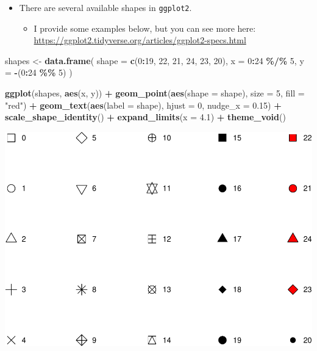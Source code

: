 \documentclass[
]{book}
\newenvironment{Shaded}{\begin{snugshade}}{\end{snugshade}}
\newcommand{\AttributeTok}[1]{\textcolor[rgb]{0.13,0.29,0.53}{#1}}
\newcommand{\DecValTok}[1]{\textcolor[rgb]{0.00,0.00,0.81}{#1}}
\newcommand{\FloatTok}[1]{\textcolor[rgb]{0.00,0.00,0.81}{#1}}
\newcommand{\FunctionTok}[1]{\textcolor[rgb]{0.13,0.29,0.53}{\textbf{#1}}}
\newcommand{\NormalTok}[1]{#1}
\newcommand{\OtherTok}[1]{\textcolor[rgb]{0.56,0.35,0.01}{#1}}
\newcommand{\SpecialCharTok}[1]{\textcolor[rgb]{0.81,0.36,0.00}{\textbf{#1}}}
\newcommand{\StringTok}[1]{\textcolor[rgb]{0.31,0.60,0.02}{#1}}
\providecommand{\tightlist}{%
  \setlength{\itemsep}{0pt}\setlength{\parskip}{0pt}}
\begin{document}
\begin{itemize}
\tightlist
\item
  There are several available shapes in \texttt{ggplot2}.

  \begin{itemize}
  \tightlist
  \item
    I provide some examples below, but you can see more here: \url{https://ggplot2.tidyverse.org/articles/ggplot2-specs.html}
  \end{itemize}
\end{itemize}

\begin{Shaded}
\begin{Highlighting}[]
\NormalTok{shapes }\OtherTok{\textless{}{-}} \FunctionTok{data.frame}\NormalTok{(}
  \AttributeTok{shape =} \FunctionTok{c}\NormalTok{(}\DecValTok{0}\SpecialCharTok{:}\DecValTok{19}\NormalTok{, }\DecValTok{22}\NormalTok{, }\DecValTok{21}\NormalTok{, }\DecValTok{24}\NormalTok{, }\DecValTok{23}\NormalTok{, }\DecValTok{20}\NormalTok{),}
  \AttributeTok{x =} \DecValTok{0}\SpecialCharTok{:}\DecValTok{24} \SpecialCharTok{\%/\%} \DecValTok{5}\NormalTok{,}
  \AttributeTok{y =} \SpecialCharTok{{-}}\NormalTok{(}\DecValTok{0}\SpecialCharTok{:}\DecValTok{24} \SpecialCharTok{\%\%} \DecValTok{5}\NormalTok{)}
\NormalTok{)}

\FunctionTok{ggplot}\NormalTok{(shapes, }\FunctionTok{aes}\NormalTok{(x, y)) }\SpecialCharTok{+} 
  \FunctionTok{geom\_point}\NormalTok{(}\FunctionTok{aes}\NormalTok{(}\AttributeTok{shape =}\NormalTok{ shape), }\AttributeTok{size =} \DecValTok{5}\NormalTok{, }\AttributeTok{fill =} \StringTok{"red"}\NormalTok{) }\SpecialCharTok{+}
  \FunctionTok{geom\_text}\NormalTok{(}\FunctionTok{aes}\NormalTok{(}\AttributeTok{label =}\NormalTok{ shape), }\AttributeTok{hjust =} \DecValTok{0}\NormalTok{, }\AttributeTok{nudge\_x =} \FloatTok{0.15}\NormalTok{) }\SpecialCharTok{+}
  \FunctionTok{scale\_shape\_identity}\NormalTok{() }\SpecialCharTok{+}
  \FunctionTok{expand\_limits}\NormalTok{(}\AttributeTok{x =} \FloatTok{4.1}\NormalTok{) }\SpecialCharTok{+}
  \FunctionTok{theme\_void}\NormalTok{()}
\end{Highlighting}
\end{Shaded}

\includegraphics{PSY202A-Modeling-I.Heo_files/figure-latex/unnamed-chunk-75-1.pdf}
\end{document}
